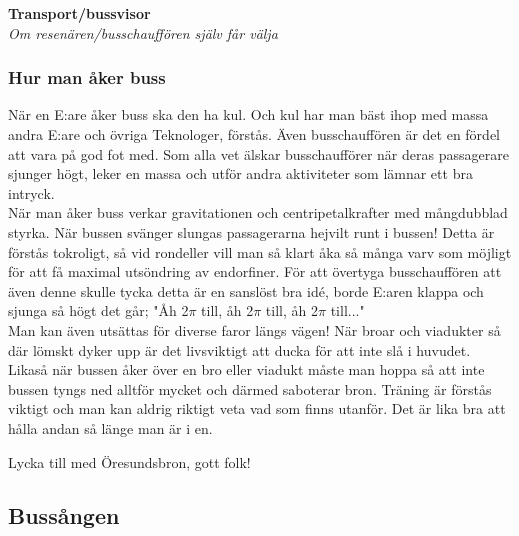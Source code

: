 \begin{center}
    \vspace*{1.5cm}
    {\fontsize{20}{20}\textbf{Transport/bussvisor}}\\
    \vspace{0.7cm}
    {\fontsize{12}{12}\textit{Om resenären/busschauffören själv får välja}}
\end{center}
\noBackground

\newpage
\resetBackground


\subsubsection*{Hur man åker buss}
När en E:are åker buss ska den ha kul. Och kul har man bäst ihop med 
massa andra E:are och övriga Teknologer, förstås. Även busschauffören 
är det en fördel att vara på god fot med. Som alla vet älskar busschaufförer 
när deras passagerare sjunger högt, leker en massa och utför andra aktiviteter 
som lämnar ett bra intryck.
\\

När man åker buss verkar gravitationen och centripetalkrafter med 
mångdubblad styrka. När bussen svänger slungas passagerarna hejvilt 
runt i bussen! Detta är förstås tokroligt, så vid rondeller vill man 
så klart åka så många varv som möjligt för att få maximal utsöndring 
av endorfiner. För att övertyga busschauffören att även denne skulle 
tycka detta är en sanslöst bra idé, borde E:aren klappa och sjunga så 
högt det går; "Åh 2$\pi$ till, åh 2$\pi$ till, åh 2$\pi$ till..."
\\

Man kan även utsättas för diverse faror längs vägen! När broar 
och viadukter så där lömskt dyker upp är det livsviktigt att ducka 
för att inte slå i huvudet. Likaså när bussen åker över en bro eller 
viadukt måste man hoppa så att inte bussen tyngs ned alltför mycket 
och därmed saboterar bron. Träning är förstås viktigt och man kan 
aldrig riktigt veta vad som finns utanför. Det är lika bra att hålla 
andan så länge man är i en.

Lycka till med Öresundsbron, gott folk!

\newpage

\subsection*{Bussången} 

